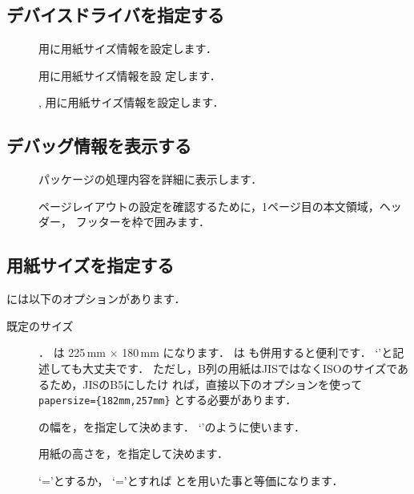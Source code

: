 \subsection{デバイスドライバを指定する}

\begin{description}
 \item[] 用に用紙サイズ情報を設定します．
 \item[] \Prog[dvipdfm]{\Dvipdfm}用に用紙サイズ情報を設
 定します．
 \item[] \Prog[pdftex]{\PDFTeX},
 \Prog[pdflatex]{\PDFLaTeX}用に用紙サイズ情報を設定します．
\end{description}

\subsection{デバッグ情報を表示する}
\begin{description}
 \item[] 
  パッケージの処理内容を詳細に表示します．
 \item[] 
  ページレイアウトの設定を確認するために，1ページ目の本文領域，ヘッダー，
  フッターを枠で囲みます．
\end{description}


\subsection{用紙サイズを指定する}
\begin{usage}
\geometry{$\<既定のサイズ>$}
\geometry{papersize=$\<用紙の幅>$,$\<用紙の高さ>$}
\geometry{paperwidth=$\<用紙の幅>$}
\geometry{paperheight=$\<用紙の高さ>$}
\end{usage}

には以下のオプションがあります．
\begin{description}
 \item[既定のサイズ]
  ．
   は 225\,mm $\times$ 180\,mm になります．
  は も併用すると便利です．
  `'と記述しても大丈夫です．
    ただし，B列の用紙はJISではなくISOのサイズであるため，JISのB5にしたけ
    れば，直接以下のオプションを使って
    \verb|papersize={182mm,257mm}| とする必要があります．
\item[] 
  の幅を，を指定して決めます．
  `'のように使います．
\item[]
  用紙の高さを，を指定して決めます．
\item[]
  `\str='とするか，
  `\str='とすれば 
  とを用いた事と等価になります．
\end{description}

